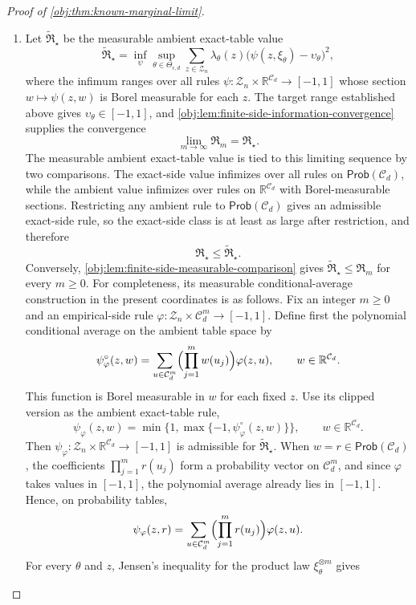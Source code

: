 \documentclass[11pt]{article}
\begin{document}
\begin{proof}[Proof of \cref{obj:thm:known-marginal-limit}]
\begin{enumerate}
\item\label{pf:known-marginal-limit:ambient-exact} Let \(\widetilde{\mathfrak R}_\star\) be the measurable ambient exact-table value
\[
\widetilde{\mathfrak R}_\star
=
\inf_{\psi}
\sup_{\theta\in\Theta_{\epsilon,d}}
\sum_{z\in\mathcal Z_n}\lambda_\theta(z)
\bigl(\psi(z,\xi_\theta)-\upsilon_\theta\bigr)^2,
\]
where the infimum ranges over all rules
\(\psi:\mathcal Z_n\times\mathbb R^{\mathcal C_d}\to[-1,1]\) whose section
\(w\mapsto\psi(z,w)\) is Borel measurable for each \(z\).  The target range established above gives
\(\upsilon_\theta\in[-1,1]\), and \cref{obj:lem:finite-side-information-convergence} supplies the convergence
\[
\lim_{m\to\infty}\mathfrak R_m=\mathfrak R_\star .
\]
The measurable ambient exact-table value is tied to this limiting sequence by two comparisons.  The exact-side value infimizes over all rules on \(\mathsf{Prob}(\mathcal C_d)\), while the ambient value infimizes over rules on \(\mathbb R^{\mathcal C_d}\) with Borel-measurable sections.  Restricting any ambient rule to \(\mathsf{Prob}(\mathcal C_d)\) gives an admissible exact-side rule, so the exact-side class is at least as large after restriction, and therefore
\[
\mathfrak R_\star\le \widetilde{\mathfrak R}_\star .
\]
Conversely, \cref{obj:lem:finite-side-measurable-comparison} gives
\(\widetilde{\mathfrak R}_\star\le\mathfrak R_m\) for every \(m\ge0\).
For completeness, its measurable conditional-average construction in the
present coordinates is as follows.  Fix an integer \(m\ge0\) and an empirical-side rule
\(\varphi:\mathcal Z_n\times\mathcal C_d^m\to[-1,1]\).  Define first the polynomial conditional average on the ambient table space by
\[
\psi_\varphi^\circ(z,w)
=
\sum_{u\in\mathcal C_d^m}
\Bigl(\prod_{j=1}^m w(u_j)\Bigr)\varphi(z,u),
\qquad
w\in\mathbb R^{\mathcal C_d}.
\]
This function is Borel measurable in \(w\) for each fixed \(z\).  Use its clipped version as the ambient exact-table rule,
\[
\psi_\varphi(z,w)
=
\min\{1,\max\{-1,\psi_\varphi^\circ(z,w)\}\},
\qquad
w\in\mathbb R^{\mathcal C_d}.
\]
Then \(\psi_\varphi:\mathcal Z_n\times\mathbb R^{\mathcal C_d}\to[-1,1]\) is admissible for \(\widetilde{\mathfrak R}_\star\).  When \(w=r\in\mathsf{Prob}(\mathcal C_d)\), the coefficients \(\prod_{j=1}^m r(u_j)\) form a probability vector on \(\mathcal C_d^m\), and since \(\varphi\) takes values in \([-1,1]\), the polynomial average already lies in \([-1,1]\).  Hence, on probability tables,
\[
\psi_\varphi(z,r)
=
\sum_{u\in\mathcal C_d^m}
\Bigl(\prod_{j=1}^m r(u_j)\Bigr)\varphi(z,u).
\]
For every \(\theta\) and \(z\), Jensen's inequality for the product law \(\xi_\theta^{\otimes m}\) gives

\end{enumerate}
\end{proof}
\end{document}
